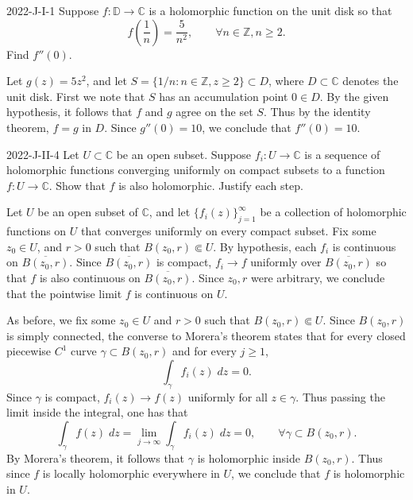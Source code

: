 \documentclass{article}
\begin{document}
	\begin{prb}{2022-J-I-1}
		Suppose $f: \mathbb{D} \to \mathbb{C}$ is a holomorphic function on the unit disk so that 
		\begin{equation*}
			f\left(\frac{1}{n}\right) = \frac{5}{n^{2}}, \qquad \forall n \in \mathbb{Z}, n \geq 2. 
		\end{equation*}
		Find $f''(0)$. 
	\end{prb}
	Let $g(z) = 5z^{2}$, and let $S = \{1/n: n \in \mathbb{Z}, z \geq 2\} \subset D$, where $D \subset \mathbb{C}$ denotes the unit disk. First we note that $S$ has an accumulation point $0 \in D$. By the given hypothesis, it follows that $f$ and $g$ agree on the set $S$. Thus by the identity theorem, $f = g$ in $D$. Since $g''(0) = 10$, we conclude that $f''(0) = 10$. 
	
	\begin{prb}{2022-J-II-4}
		Let $U \subset \mathbb{C}$ be an open subset. Suppose $f_{i}: U \to \mathbb{C}$ is a sequence of holomorphic functions converging uniformly on compact subsets to a function $f: U \to \mathbb{C}$. Show that $f$ is also holomorphic. Justify each step. 
	\end{prb}
	Let $U$ be an open subset of $\mathbb{C}$, and let $\{f_{i}(z)\}_{j = 1}^{\infty}$ be a collection of holomorphic functions on $U$ that converges uniformly on every compact subset. Fix some $z_{0} \in U$, and $r > 0$ such that $B(z_{0}, r) \Subset U$. By hypothesis, each $f_{i}$ is continuous on $\overline{B(z_{0}, r)}$. Since $\overline{B(z_{0}, r)}$ is compact, $f_{i}\to f$ uniformly over $\overline{B(z_{0}, r)}$ so that $f$ is also continuous on $\overline{B(z_{0}, r)}$. Since $z_{0}, r$ were arbitrary, we conclude that the pointwise limit $f$ is continuous on $U$. 
	
	As before, we fix some $z_{0}\in U$ and $r > 0$ such that $B(z_{0}, r) \Subset U$. Since $B(z_{0}, r)$ is simply connected, the converse to Morera's theorem states that for every closed piecewise $C^{1}$ curve $\gamma \subset B(z_{0}, r)$ and for every $j \geq 1$, 
	\begin{equation*}
		\int_{\gamma}f_{i}(z)\;dz = 0. 
	\end{equation*}
	Since $\gamma$ is compact, $f_{i}(z) \to f(z)$ uniformly for all $z \in \gamma$. Thus passing the limit inside the integral, one has that 
	\begin{equation*}
		\int_{\gamma}f(z)\;dz = \lim_{j \to \infty}\int_{\gamma}f_{i}(z)\;dz = 0, \qquad \forall \gamma \subset B(z_{0}, r). 
	\end{equation*}
	By Morera's theorem, it follows that $\gamma$ is holomorphic inside $B(z_{0}, r)$. Thus since $f$ is locally holomorphic everywhere in $U$, we conclude that $f$ is holomorphic in $U$. 
	
\end{document}
